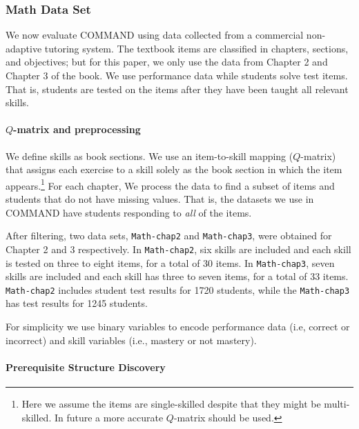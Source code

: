 \documentclass{edm_template}
\begin{document}
	
	\subsubsection{Math Data Set}
	We now evaluate COMMAND using data collected from a commercial non-adaptive tutoring system.
	The textbook items are classified in chapters, sections, and objectives; but for this paper, we only use the data from Chapter 2 and Chapter 3 of the book.
	We use performance data while students solve test items. That is, students are tested on the items after they have been taught all relevant skills.
	
	\paragraph{$Q$-matrix and preprocessing}
	\label{sec:preprocessing}
	We define skills as book sections.
	We use an item-to-skill mapping ($Q$-matrix) that assigns each exercise to a skill solely as the book section in which the item appears.\footnote{Here we assume the items are single-skilled despite that they might be multi-skilled. In future a more accurate $Q$-matrix should be used.}
	For each chapter, We process the data to find a subset of items and students that do not have missing values.
	That is, the datasets we use in COMMAND have students responding to \textit{all} of the  items.
	
	After filtering, two data sets, \texttt{Math-chap2} and \texttt{Math-chap3}, were obtained for Chapter 2 and 3 respectively. 
	In \texttt{Math-chap2}, six skills are included and each skill is tested on three to eight items, for a total of 30  items.
	In \texttt{Math-chap3}, seven skills are included and each skill has three to seven items, for a total of 33 items.
	\texttt{Math-chap2} includes student test results for 1720 students, 
	while the \texttt{Math-chap3} has test results for 1245 students.
	
	For simplicity we use binary variables to encode  performance data (i.e, correct or incorrect) and skill variables  (i.e., mastery or not mastery).
	
	\paragraph{Prerequisite Structure Discovery}
	\label{sec:prerequisite_results}
	
\end{document}
